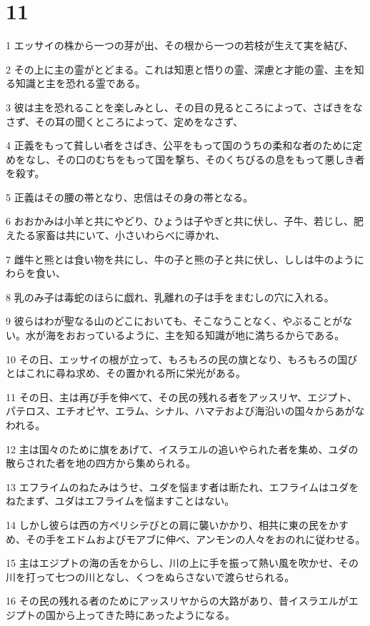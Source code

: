 \chapter{11}

\par 1 エッサイの株から一つの芽が出、その根から一つの若枝が生えて実を結び、
\par 2 その上に主の霊がとどまる。これは知恵と悟りの霊、深慮と才能の霊、主を知る知識と主を恐れる霊である。
\par 3 彼は主を恐れることを楽しみとし、その目の見るところによって、さばきをなさず、その耳の聞くところによって、定めをなさず、
\par 4 正義をもって貧しい者をさばき、公平をもって国のうちの柔和な者のために定めをなし、その口のむちをもって国を撃ち、そのくちびるの息をもって悪しき者を殺す。
\par 5 正義はその腰の帯となり、忠信はその身の帯となる。
\par 6 おおかみは小羊と共にやどり、ひょうは子やぎと共に伏し、子牛、若じし、肥えたる家畜は共にいて、小さいわらべに導かれ、
\par 7 雌牛と熊とは食い物を共にし、牛の子と熊の子と共に伏し、ししは牛のようにわらを食い、
\par 8 乳のみ子は毒蛇のほらに戯れ、乳離れの子は手をまむしの穴に入れる。
\par 9 彼らはわが聖なる山のどこにおいても、そこなうことなく、やぶることがない。水が海をおおっているように、主を知る知識が地に満ちるからである。
\par 10 その日、エッサイの根が立って、もろもろの民の旗となり、もろもろの国びとはこれに尋ね求め、その置かれる所に栄光がある。
\par 11 その日、主は再び手を伸べて、その民の残れる者をアッスリヤ、エジプト、パテロス、エチオピヤ、エラム、シナル、ハマテおよび海沿いの国々からあがなわれる。
\par 12 主は国々のために旗をあげて、イスラエルの追いやられた者を集め、ユダの散らされた者を地の四方から集められる。
\par 13 エフライムのねたみはうせ、ユダを悩ます者は断たれ、エフライムはユダをねたまず、ユダはエフライムを悩ますことはない。
\par 14 しかし彼らは西の方ペリシテびとの肩に襲いかかり、相共に東の民をかすめ、その手をエドムおよびモアブに伸べ、アンモンの人々をおのれに従わせる。
\par 15 主はエジプトの海の舌をからし、川の上に手を振って熱い風を吹かせ、その川を打って七つの川となし、くつをぬらさないで渡らせられる。
\par 16 その民の残れる者のためにアッスリヤからの大路があり、昔イスラエルがエジプトの国から上ってきた時にあったようになる。

